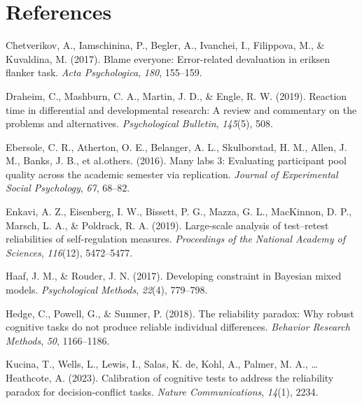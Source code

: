 \documentclass[
  man,floatsintext]{apa6}
\newlength{\cslhangindent}
\newlength{\cslentryspacingunit} %
\newenvironment{CSLReferences}[2] %
 {%
  \setlength{\parindent}{0pt}
  \ifodd #1
  \let\oldpar\par
  \def\par{\hangindent=\cslhangindent\oldpar}
  \fi
  \setlength{\parskip}{#2\cslentryspacingunit}
 }%
 {}
\begin{document}
\newpage

\hypertarget{references}{%
\section{References}\label{references}}

\hypertarget{refs}{}
\begin{CSLReferences}{1}{0}
\leavevmode{}%
Chetverikov, A., Iamschinina, P., Begler, A., Ivanchei, I., Filippova, M., \& Kuvaldina, M. (2017). Blame everyone: Error-related devaluation in eriksen flanker task. \emph{Acta Psychologica}, \emph{180}, 155--159.

\leavevmode{}%
Draheim, C., Mashburn, C. A., Martin, J. D., \& Engle, R. W. (2019). Reaction time in differential and developmental research: A review and commentary on the problems and alternatives. \emph{Psychological Bulletin}, \emph{145}(5), 508.

\leavevmode{}%
Ebersole, C. R., Atherton, O. E., Belanger, A. L., Skulborstad, H. M., Allen, J. M., Banks, J. B., et al.others. (2016). Many labs 3: Evaluating participant pool quality across the academic semester via replication. \emph{Journal of Experimental Social Psychology}, \emph{67}, 68--82.

\leavevmode{}%
Enkavi, A. Z., Eisenberg, I. W., Bissett, P. G., Mazza, G. L., MacKinnon, D. P., Marsch, L. A., \& Poldrack, R. A. (2019). Large-scale analysis of test--retest reliabilities of self-regulation measures. \emph{Proceedings of the National Academy of Sciences}, \emph{116}(12), 5472--5477.

\leavevmode{}%
Haaf, J. M., \& Rouder, J. N. (2017). Developing constraint in {B}ayesian mixed models. \emph{Psychological Methods}, \emph{22}(4), 779--798.

\leavevmode{}%
Hedge, C., Powell, G., \& Sumner, P. (2018). The reliability paradox: Why robust cognitive tasks do not produce reliable individual differences. \emph{Behavior Research Methods}, \emph{50}, 1166--1186.

\leavevmode{}%
Kucina, T., Wells, L., Lewis, I., Salas, K. de, Kohl, A., Palmer, M. A., \ldots{} Heathcote, A. (2023). Calibration of cognitive tests to address the reliability paradox for decision-conflict tasks. \emph{Nature Communications}, \emph{14}(1), 2234.


\end{CSLReferences}
\end{document}
